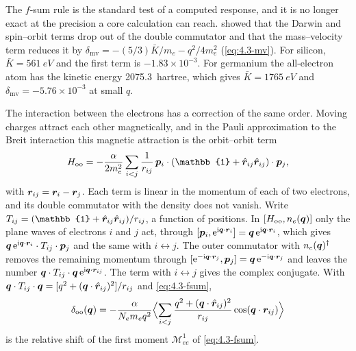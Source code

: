 The $f$-sum rule is the standard test of a computed response, and it is no longer exact at the precision a core calculation can reach.  showed that the Darwin and spin--orbit terms drop out of the double commutator and that the mass--velocity term reduces it by $\delta_{\mathrm{mv}} = -(5/3)\bar K/m_e - q^2/4m_e^2$ (\cref{eq:4.3-mv}). For silicon, $\bar K = \SI{561}{eV}$ and the first term is $-1.83\times10^{-3}$. For germanium the all-electron atom has the kinetic energy \SI{2075.3}{hartree}, which gives $\bar K = \SI{1765}{eV}$ and $\delta_{\mathrm{mv}} = -5.76\times10^{-3}$ at small $q$.

The interaction between the electrons has a correction of the same order. Moving charges attract each other magnetically, and in the Pauli approximation to the Breit interaction this magnetic attraction is the orbit--orbit term~\cite[Sect.~39]{bethe1957quantum}
\begin{equation*}
  H_{\mathrm{oo}} = -\frac{\alpha}{2m_e^2}\sum_{i<j}\frac{1}{r_{ij}}\,\vect{p}_i\cdot(\mathbb{1} + \hat{\vect{r}}_{ij}\hat{\vect{r}}_{ij})\cdot\vect{p}_j ,
\end{equation*}
with $\bm{r}_{ij} = \bm{r}_i - \bm{r}_j$. Each term is linear in the momentum of each of two electrons, and its double commutator with the density does not vanish. Write $T_{ij} = (\mathbb{1} + \hat{\vect{r}}_{ij}\hat{\vect{r}}_{ij})/r_{ij}$, a function of positions. In $[H_{\mathrm{oo}}, n_e(\bm{q})]$ only the plane waves of electrons $i$ and $j$ act, through $[\bm{p}_i, \mathrm{e}^{\mathrm{i}\bm{q}\cdot\bm{r}_i}] = \bm{q}\,\mathrm{e}^{\mathrm{i}\bm{q}\cdot\bm{r}_i}$, which gives $\bm{q}\,\mathrm{e}^{\mathrm{i}\bm{q}\cdot\bm{r}_i}\cdot T_{ij}\cdot\bm{p}_j$ and the same with $i \leftrightarrow j$. The outer commutator with $n_e(\bm{q})^\dagger$ removes the remaining momentum through $[\mathrm{e}^{-\mathrm{i}\bm{q}\cdot\bm{r}_j}, \bm{p}_j] = \bm{q}\,\mathrm{e}^{-\mathrm{i}\bm{q}\cdot\bm{r}_j}$ and leaves the number $\bm{q}\cdot T_{ij}\cdot\bm{q}\,\mathrm{e}^{\mathrm{i}\bm{q}\cdot\bm{r}_{ij}}$. The term with $i \leftrightarrow j$ gives the complex conjugate. With $\bm{q}\cdot T_{ij}\cdot\bm{q} = [q^2 + (\bm{q}\cdot\hat{\bm{r}}_{ij})^2]/r_{ij}$ and \cref{eq:4.3-fsum},
\begin{equation}
  \delta_{\mathrm{oo}}(\bm{q}) = -\frac{\alpha}{N_em_eq^2}\Bigl\langle\sum_{i<j}\frac{q^2 + (\bm{q}\cdot\hat{\bm{r}}_{ij})^2}{r_{ij}}\cos(\bm{q}\cdot\bm{r}_{ij})\Bigr\rangle
  \label{eq:10.6-oo}
\end{equation}
is the relative shift of the first moment $\mathscr{M}^1_{ee}$ of \cref{eq:4.3-fsum}.
